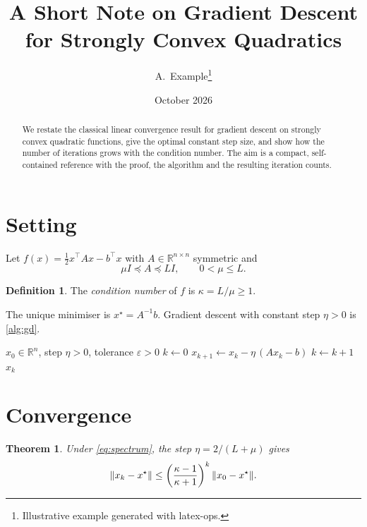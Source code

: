 \documentclass[11pt,a4paper]{article}
\title{\vspace{-2em}A Short Note on Gradient Descent\\for Strongly Convex Quadratics}
\author{A.\ Example\thanks{Illustrative example generated with latex-ops.}}
\date{October 2026}
\newtheorem{theorem}{Theorem}
\theoremstyle{definition}
\newtheorem{definition}{Definition}
\DeclarePairedDelimiter{\norm}{\lVert}{\rVert}
\newcommand{\R}{\mathbb{R}}
\begin{document}
\maketitle

\begin{abstract}
\noindent We restate the classical linear convergence result for gradient descent on
strongly convex quadratic functions, give the optimal constant step size, and show how the
number of iterations grows with the condition number. The aim is a compact, self-contained
reference with the proof, the algorithm and the resulting iteration counts.
\end{abstract}

\section{Setting}

Let $f(x) = \tfrac12 x^\top A x - b^\top x$ with $A \in \R^{n\times n}$ symmetric and
\begin{equation}\label{eq:spectrum}
  \mu I \preceq A \preceq L I, \qquad 0 < \mu \le L .
\end{equation}

\begin{definition}
The \emph{condition number} of $f$ is $\kappa = L/\mu \ge 1$.
\end{definition}

The unique minimiser is $x^\star = A^{-1}b$. Gradient descent with constant step
$\eta > 0$ is \cref{alg:gd}.

\begin{algorithm}[ht]
\caption{Gradient descent with constant step}\label{alg:gd}
\begin{algorithmic}[1]
\Require $x_0 \in \R^n$, step $\eta > 0$, tolerance $\varepsilon > 0$
\State $k \gets 0$
  \State $x_{k+1} \gets x_k - \eta\,(A x_k - b)$
  \State $k \gets k + 1$
\EndWhile
\State \Return $x_k$
\end{algorithmic}
\end{algorithm}

\section{Convergence}

\begin{theorem}\label{thm:rate}
Under \eqref{eq:spectrum}, the step $\eta = 2/(L+\mu)$ gives
\begin{equation}\label{eq:rate}
  \norm{x_k - x^\star} \le \left(\frac{\kappa - 1}{\kappa + 1}\right)^{k} \norm{x_0 - x^\star}.
\end{equation}
\end{theorem}
\end{document}
